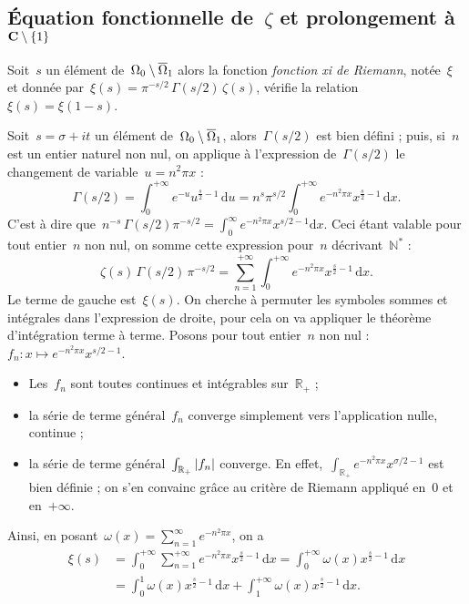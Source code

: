 	\subsection{Équation fonctionnelle de~$\zeta$ et prolongement à~$\mathbf{C}\setminus\{1\}$} \label{subsection:equaFonctionelle}
	\unboldmath
		\begin{prop}	\label{prop:EquaFonctXi}
			Soit~$s$ un élément de~$\Omega_0\setminus\overline{\Omega}_1$ alors la fonction \emph{fonction xi de Riemann}, notée~$\xi$ et donnée par~$\xi(s) = \pi^{-s/2}\, \Gamma(s/2)\, \zeta(s)$, vérifie la relation~$\xi(s) = \xi(1-s)$.
		\end{prop}
		\begin{dem}
			Soit~$s=\sigma+it$ un élément de~$\Omega_0\setminus\overline{\Omega}_1$, alors~$\Gamma(s/2)$ est bien défini ; puis, si~$n$ est un entier naturel non nul, on applique à l'expression de~$\Gamma(s/2)$ le changement de variable~$u = n^2 \pi x$ :
			\[
				\Gamma(s/2) = \int_{0}^{+\infty} e^{-u} u^{\frac{s}{2}-1} \,\mathrm{d}u
							= n^s \pi^{s/2}
								\int_{0}^{+\infty} e^{-n^2 \pi x} x^{\frac{s}{2}-1} \,\mathrm{d}x.
			\]
			C'est à dire que~$n^{-s}\,\Gamma(s/2)\pi^{-s/2} = \int_{0}^{\infty} e^{-n^2 \pi x} x^{s/2-1} \mathrm{d}x$. Ceci étant valable pour tout entier~$n$ non nul, on somme cette expression pour~$n$ décrivant~$\mathbb{N}^*$ :
			\[
					\zeta(s)\,\Gamma(s/2)\,\pi^{-s/2} 
				= 	\sum_{n=1}^{+\infty} \int_{0}^{+\infty} 
						e^{-n^2\pi x} x^{\frac{s}{2}-1} \,\mathrm{d}x.
			\]
			Le terme de gauche est~$\xi(s)$. On cherche à permuter les symboles sommes et intégrales dans l'expression de droite, pour cela on va appliquer le théorème d'intégration terme à terme. Posons pour tout entier~$n$ non nul :~$f_n : x\mapsto e^{-n^2\pi x}x^{s/2-1}$.
			\begin{itemize}
				\item Les~$f_n$ sont toutes continues et intégrables sur~$\mathbb{R}_+$ ;
				\item la série de terme général~$f_n$ converge simplement vers l'application nulle, continue ;
				\item la série de terme général~$\int_{\mathbb{R}_+} \left\vert f_n\right\vert$ converge. En effet,~$\int_{\mathbb{R}_+} e^{-n^2\pi x} x^{\sigma/2-1}$ est bien définie ; on s'en convainc grâce au critère de Riemann appliqué en~$0$ et en~$+\infty$.
			\end{itemize}
			Ainsi, en posant~$\omega(x) = \sum_{n=1}^{\infty} e^{-n^2\pi x}$, on a
			\begin{align}
				\xi(s)
				&= \int_{0}^{+\infty} \sum_{n=1}^{+\infty} e^{-n^2\pi x} x^{\frac{s}{2}-1}\,\mathrm{d}x
				= \int_{0}^{+\infty} \omega(x) x^{\frac{s}{2}-1}\,\mathrm{d}x	\nonumber\\
				&= \int_{0}^{1} \omega(x) x^{\frac{s}{2}-1}\,\mathrm{d}x + \int_{1}^{+\infty} \omega(x) x^{\frac{s}{2}-1}\,\mathrm{d}x. \label{eq:preCalcXi}
			\end{align}
			

\end{dem}

